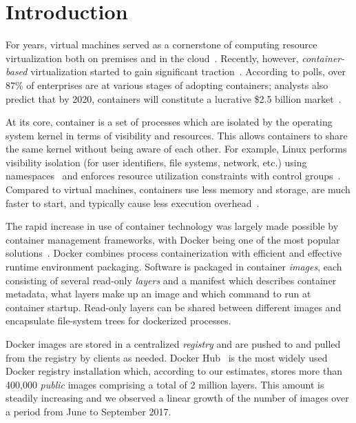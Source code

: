 \section{Introduction}

For years, virtual machines served as a cornerstone of computing resource
virtualization both on premises and in the cloud~\cite{rosenblum2005virtual}.
%
Recently, however, \emph{container-based} virtualization started to gain
significant traction~\cite{process-containers-linux}.
%
According to polls, over 87\% of enterprises are at various stages of adopting
containers; analysts also predict that by 2020, containers will constitute a
lucrative \$2.5 billion market~\cite{container-grow-by2020}.



At its core, container is a set of processes which are isolated by the operating
system kernel in terms of visibility and resources. This allows containers to share
the same kernel without being aware of each other.
%
For example, Linux performs visibility isolation (for user identifiers, file systems,
network, etc.) using namespaces~\cite{man-namespaces} and enforces resource
utilization constraints with control groups~\cite{kernel-doc-cgroups}.
%
Compared to virtual machines, containers use less memory and storage, are much
faster to start, and typically cause less execution
overhead~\cite{felter2015updated,container-efficiency}.

The rapid increase in use of container technology was largely made possible by
container management frameworks, with Docker being one of the most popular
solutions~\cite{docker}.
%
Docker combines process containerization with efficient and effective runtime
environment packaging.
%
Software is packaged in container \emph{images}, each consisting of several
read-only \emph{layers} and a manifest which describes container metadata, \eg
what layers make up an image and which command to run at container startup.
%
Read-only layers can be shared between different images and encapsulate
file-system trees for dockerized processes.

%



Docker images are stored in a centralized \emph{registry} and are pushed to and
pulled from the registry by clients as needed.
%
Docker Hub~\cite{dockerhub} is the most widely used Docker registry
installation which, according to our estimates, stores more than 400,000
\emph{public} images comprising a total of 2 million layers.
%
This amount is steadily increasing and we observed a linear growth of the
number of images over a period from June to September 2017.



